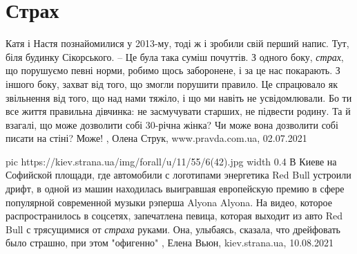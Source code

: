  
 
 
 
 
\chapter{Страх}
\label{sec:slova.strah}

Катя і Настя познайомилися у 2013-му, тоді ж і зробили свій перший напис. Тут,
біля будинку Сікорського. – Це була така суміш почуттів. З одного боку,
\emph{страх}, що порушуємо певні норми, робимо щось заборонене, і за це нас
покарають. З іншого боку, захват від того, що змогли порушити правило. Це
спрацювало як звільнення від того, що над нами тяжіло, і що ми навіть не
усвідомлювали.  Бо ти все життя правильна дівчинка: не засмучувати старших, не
підвести родину.  Та й взагалі, що може дозволити собі 30-річна жінка? Чи може
вона дозволити собі писати на стіні? Може!
, 
Олена Струк, www.pravda.com.ua, 02.07.2021 

\ifcmt
  pic https://kiev.strana.ua/img/forall/u/11/55/6(42).jpg
  width 0.4
\fi
В Киеве на Софийской площади, где автомобили с логотипами энергетика Red Bull
устроили дрифт, в одной из машин находилась выигравшая европейскую премию в
сфере популярной современной музыки рэперша Alyona Alyona.  На видео, которое
распространилось в соцсетях, запечатлена певица, которая выходит из авто Red
Bull с трясущимися от \emph{страха} руками. Она, улыбаясь, сказала, что дрейфовать
было страшно, при этом "офигенно"
, 
Елена Вьюн, kiev.strana.ua, 10.08.2021


